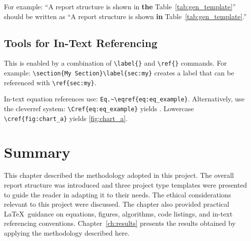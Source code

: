 For example: ``A report structure is shown in \textbf{the} 
Table~\ref{tab:gen_template}'' should be written as ``A report structure is 
shown \textbf{in} Table~\ref{tab:gen_template}.''

\subsection{Tools for In-Text Referencing}
\label{subsec:reftools}
This is enabled by a combination of \verb|\label{}| and \verb|\ref{}| commands. 
For example: \lstinline!\section{My Section}\label{sec:my}! creates a label 
that can be referenced with \verb|\ref{sec:my}|.

In-text equation references use: \lstinline!Eq.~\eqref{eq:eq_example}!.
Alternatively, use the cleverref system: \verb|\Cref{eq:eq_example}| 
yields . Lowercase \verb|\cref{fig:chart_a}| yields 
\cref{fig:chart_a}.

\section{Summary}
\label{sec:method_summary}

This chapter described the methodology adopted in this project. The overall 
report structure was introduced and three project type templates were presented 
to guide the reader in adapting it to their needs. The ethical considerations 
relevant to this project were discussed. The chapter also provided practical 
\LaTeX~guidance on equations, figures, algorithms, code listings, and 
in-text referencing conventions. Chapter~\ref{ch:results} presents the results 
obtained by applying the methodology described here.